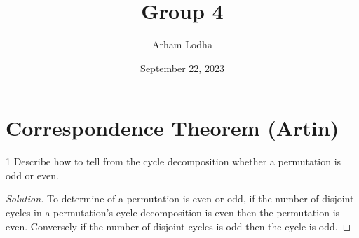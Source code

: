 \documentclass{article}
\newenvironment{solution}
{\renewcommand\qedsymbol{$\blacksquare$}\begin{proof}[Solution]}
{\end{proof}}
\begin{document}
\title{Group 4}
\author{Arham Lodha}%
\date{September 22, 2023}%
\maketitle

\section*{Correspondence Theorem (Artin)}

\begin{PROB}{1}\label{Problem 1.}
    Describe how to tell from the cycle decomposition whether a permutation is odd or even.
\end{PROB}
\begin{solution}
    To determine of a permutation is even or odd, if the number of disjoint cycles in a permutation's cycle decomposition is even then the permutation is even. Conversely if the number of disjoint cycles is odd then the cycle is odd. 
\end{solution}

\bigskip
\end{document}
